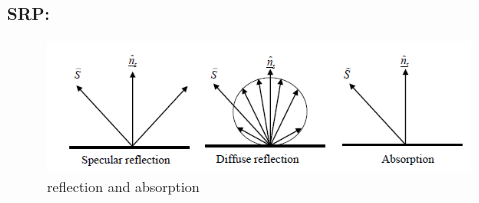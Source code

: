 \documentclass[11pt]{article}
\begin{document}
\subsubsection{SRP:}

\begin{figure} [H]
\centering 
\includegraphics[scale=1]{SRP.PNG}
\caption{ reflection and absorption
\cite{SRP}}
\end{figure}
\end{document}
